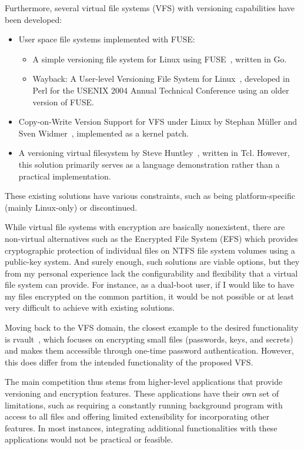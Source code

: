 Furthermore, several virtual file systems (VFS) with versioning capabilities have been developed:

\begin{itemize}
    \item User space file systems implemented with FUSE:
    \begin{itemize}
        \item A simple versioning file system for Linux using FUSE~\cite{simple_vfs}, written in Go.
        \item Wayback: A User-level Versioning File System for Linux~\cite{wayback_vfs}, developed in Perl for the USENIX 2004 Annual Technical Conference using an older version of FUSE\@.
    \end{itemize}
    \item Copy-on-Write Version Support for VFS under Linux by Stephan Müller and Sven Widmer~\cite{vvfs}, implemented as a kernel patch.
    \item A versioning virtual filesystem by Steve Huntley~\cite{huntley_vvfs}, written in Tcl.
    However, this solution primarily serves as a language demonstration rather than a practical implementation.
\end{itemize}

These existing solutions have various constraints, such as being platform-specific (mainly Linux-only) or discontinued.

While virtual file systems with encryption are basically nonexistent, there are non-virtual alternatives such as the Encrypted File System (EFS) which provides cryptographic protection of individual files on NTFS file system volumes using a public-key system.
And surely enough, such solutions are viable options, but they from my personal experience lack the configurability and flexibility that a virtual file system can provide.
For instance, as a dual-boot user, if I would like to have my files encrypted on the common partition, it would be not possible or at least very difficult to achieve with existing solutions.

Moving back to the VFS domain, the closest example to the desired functionality is rvault~\cite{rvault}, which focuses on encrypting small files (passwords, keys, and secrets) and makes them accessible through one-time password authentication.
However, this does differ from the intended functionality of the proposed VFS\@.

The main competition thus stems from higher-level applications that provide versioning and encryption features.
These applications have their own set of limitations, such as requiring a constantly running background program with access to all files and offering limited extensibility for incorporating other features.
In most instances, integrating additional functionalities with these applications would not be practical or feasible.

